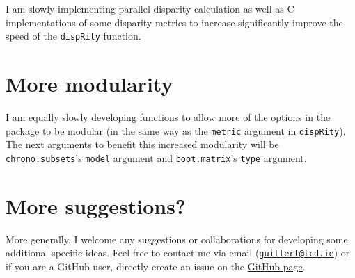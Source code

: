 \documentclass[]{book}
\theoremstyle{definition}
\theoremstyle{definition}
\theoremstyle{definition}
\theoremstyle{remark}
\begin{document}
I am slowly implementing parallel disparity calculation as well as C
implementations of some disparity metrics to increase significantly
improve the speed of the \texttt{dispRity} function.

\section{More modularity}\label{more-modularity}

I am equally slowly developing functions to allow more of the options in
the package to be modular (in the same way as the \texttt{metric}
argument in \texttt{dispRity}). The next arguments to benefit this
increased modularity will be \texttt{chrono.subsets}'s \texttt{model}
argument and \texttt{boot.matrix}'s \texttt{type} argument.

\section{More suggestions?}\label{more-suggestions}

More generally, I welcome any suggestions or collaborations for
developing some additional specific ideas. Feel free to contact me via
email (\href{mailto:guillert@tcd.ie}{\nolinkurl{guillert@tcd.ie}}) or if
you are a GitHub user, directly create an issue on the
\href{https://github.com/TGuillerme/dispRity}{GitHub page}.


\end{document}
